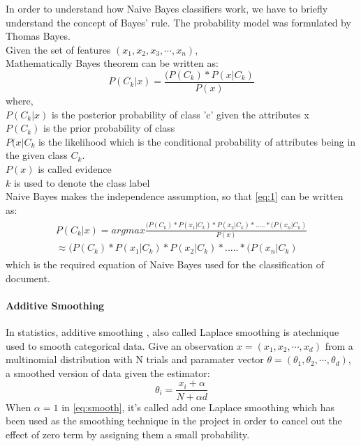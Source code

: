 In order to understand how Naive Bayes classifiers \cite{naive} work, we have to briefly understand the concept of Bayes' rule. The probability model was formulated by Thomas Bayes.\\
Given the set of features $(x_1,x_2,x_3,\cdots, x_n)$, \\
Mathematically Bayes theorem can be written as:
\begin{equation}\label{eq:1}
P(C_{k}|x) = \frac{(P(C_{k}) * P(x|C_{k})} { P(x)}
\end{equation}
where,\\
$P(C_{k} |x)$ is the posterior probability of class 'c' given the attributes x \\
$P(C_{k})$ is the prior probability of class \\
$P(x|C_{k}$ is the likelihood which is the conditional probability of attributes being in the given class $C_k$.\\
$P(x)$ is called evidence \\
$k$ is used to denote the class label \\
Naive Bayes makes the independence assumption, so that \ref{eq:1} can be written as:
\begin{align}
\begin{split}\label{eq:naive}
P(C_{k}|x) = argmax \frac{(P(C_{k}) * P(x_1|C_{k}) * P(x_2|C_{k})*.....* (P(x_n|C_{k})} { P(x)} \\
\approx  (P(C_{k}) * P(x_1|C_{k}) * P(x_2|C_{k})*.....* (P(x_n|C_{k})
\end{split}
\end{align}
which is the required equation of Naive Bayes used for the classification of document.

\paragraph{Additive Smoothing}\hfill

In statistics, additive smoothing \cite{additive}, also called Laplace smoothing is atechnique used to smooth categorical data. Give an observation $x = (x_1,x_2,\cdots,x_d)$ from a multinomial distribution with N trials and paramater vector $\theta = (\theta_1,\theta_2,\cdots,\theta_d)$, a smoothed version of data given the estimator:
\begin{equation}\label{eq:smooth}
	\theta_i = \frac{x_i + \alpha}{N+ \alpha d}
\end{equation}
When $\alpha = 1 $ in \ref{eq:smooth}, it's called add one Laplace smoothing which has been used as the smoothing technique in the project in order to cancel out the effect of zero term by assigning them a small probability.

